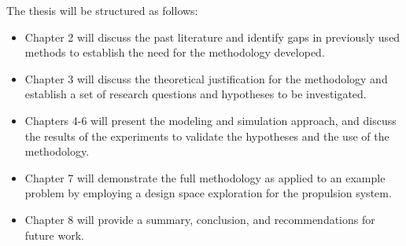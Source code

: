 The thesis will be structured as follows:  
\begin{itemize}
	\item{Chapter 2 will discuss the past literature and identify gaps in previously used methods to establish the need for the methodology developed.}
	\item{Chapter 3 will discuss the theoretical justification for the methodology and establish a set of research questions and hypotheses to be investigated.}
	\item{Chapters 4-6 will present the modeling and simulation approach, and discuss the results of the experiments to validate the hypotheses and the use of the methodology.}
	\item{Chapter 7 will demonstrate the full methodology as applied to an example problem by employing a design space exploration for the propulsion system.}
	\item{Chapter 8 will provide a summary, conclusion, and recommendations for future work.}
\end{itemize}

